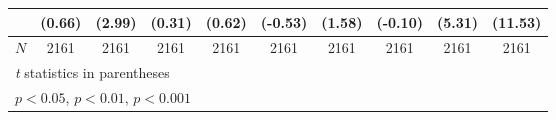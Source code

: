 {\begin{tabular}{l*{9}{c}}
            &      (0.66)         &      (2.99)         &      (0.31)         &      (0.62)         &     (-0.53)         &      (1.58)         &     (-0.10)         &      (5.31)         &     (11.53)         \\
\hline
\(N\)       &        2161         &        2161         &        2161         &        2161         &        2161         &        2161         &        2161         &        2161         &        2161         \\
\hline\hline
\multicolumn{10}{l}{\footnotesize \textit{t} statistics in parentheses}\\
\multicolumn{10}{l}{\footnotesize \sym{*} \(p<0.05\), \sym{**} \(p<0.01\), \sym{***} \(p<0.001\)}\\
\end{tabular}
}
